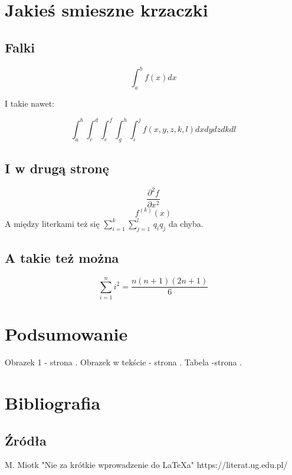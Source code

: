 \documentclass{article}
\begin{document}
\newpage
\section{Jakieś smieszne krzaczki}

\subsection{Falki} 

$$\int_{a}^b f(x)dx$$

I takie nawet:

$$\int_{a}^b\int_{c}^d\int_{e}^f\int_{g}^h\int_{i}^j f(x,y,z,k,l)dxdydzdkdl$$

\subsection{I w drugą stronę} 

$$\frac{\partial^2 f}{\partial x^2}$$  $$f^{(k)}(x)$$
A między literkami też się $\sum^k_{i=1}\sum^l_{j=1}\,q_i q_j$ da chyba.

\subsection{A takie też można} 

$$\sum_{i=1}^n i^2 = \frac{n(n+1)(2n+1)}{6}$$

\section{Podsumowanie}

Obrazek 1 - strona \pageref{o0}.
Obrazek w tekście - strona \pageref{o1}.
Tabela -strona \pageref{tab}.

\newpage
\section{Bibliografia}\label{bb}
\subsection{Źródła}
M. Miotk "Nie za krótkie wprowadzenie do LaTeXa"
https://literat.ug.edu.pl/
\end{document}
